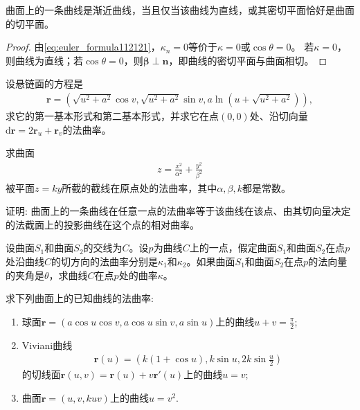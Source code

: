\documentclass[../../main.tex]{subfiles}%
\begin{document}
\begin{theorem}
曲面上的一条曲线是渐近曲线，当且仅当该曲线为直线，或其密切平面恰好是曲面的切平面。
\end{theorem}
\begin{proof}

由\eqref{eq:euler_formula112121}，$\kappa_n=0$等价于$\kappa=0$或$\cos\theta=0$。
若$\kappa=0$，则曲线为直线；若$\cos\theta=0$，则$\boldsymbol{\beta}\perp\boldsymbol{n}$，即曲线的密切平面与曲面相切。

\end{proof}

\begin{example}
设悬链面的方程是
\begin{align*}
\boldsymbol{r} = \left( \sqrt{u^2 + a^2}\cos v,\sqrt{u^2 + a^2}\sin v,a\ln\left(u + \sqrt{u^2 + a^2}\right) \right),
\end{align*}
求它的第一基本形式和第二基本形式，并求它在点$(0,0)$处、沿切向量$\mathrm{d}\boldsymbol{r} = 2\boldsymbol{r}_u + \boldsymbol{r}_v$的法曲率。
\end{example}

\begin{example}
求曲面
\begin{align*}
z = \frac{x^2}{\alpha^2} + \frac{y^2}{\beta^2}
\end{align*}
被平面$z = ky$所截的截线在原点处的法曲率，其中$\alpha,\beta,k$都是常数。
\end{example}

\begin{example}
证明: 曲面上的一条曲线在任意一点的法曲率等于该曲线在该点、由其切向量决定的法截面上的投影曲线在这个点的相对曲率。
\end{example}

\begin{example}
设曲面$S_1$和曲面$S_2$的交线为$C$。设$p$为曲线$C$上的一点，假定曲面$S_1$和曲面$S_2$在点$p$处沿曲线$C$的切方向的法曲率分别是$\kappa_1$和$\kappa_2$。如果曲面$S_1$和曲面$S_2$在点$p$的法向量的夹角是$\theta$，求曲线$C$在点$p$处的曲率$\kappa$。
\end{example}

\begin{example}
求下列曲面上的已知曲线的法曲率:
\begin{enumerate}[(1)]
\item 球面$\boldsymbol{r} = (a\cos u\cos v,a\cos u\sin v,a\sin u)$上的曲线$u + v = \frac{\pi}{2}$;
\item Viviani曲线
\begin{align*}
\boldsymbol{r}(u) = \left( k(1+\cos u),k\sin u,2k\sin\frac{u}{2} \right)
\end{align*}
的切线面$\boldsymbol{r}(u,v) = \boldsymbol{r}(u) + v\boldsymbol{r}'(u)$上的曲线$u = v$;
\item 曲面$\boldsymbol{r} = (u,v,kuv)$上的曲线$u = v^2$.
\end{enumerate}
\end{example}
\end{document}
